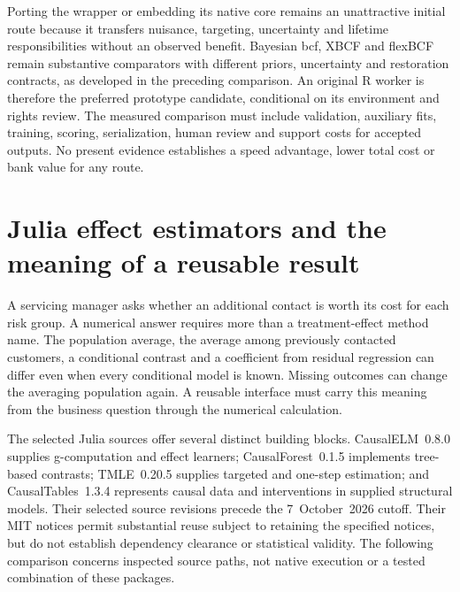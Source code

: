 Porting the wrapper or embedding its native core remains an unattractive initial route because it transfers nuisance, targeting, uncertainty and lifetime responsibilities without an observed benefit. Bayesian bcf, XBCF and flexBCF remain substantive comparators with different priors, uncertainty and restoration contracts, as developed in the preceding comparison. An original R worker is therefore the preferred prototype candidate, conditional on its environment and rights review. The measured comparison must include validation, auxiliary fits, training, scoring, serialization, human review and support costs for accepted outputs. No present evidence establishes a speed advantage, lower total cost or bank value for any route.~\citep{exec21_grf_reuse,exec21_cxx_bcf,exec21_cxx_xbcf,exec21_cxx_flexbcf}



\section{Julia effect estimators and the meaning of a reusable result}
\label{exec21:effects-scope}

A servicing manager asks whether an additional contact is worth its cost for
each risk group. A numerical answer requires more than a treatment-effect
method name. The population average, the average among previously contacted
customers, a conditional contrast and a coefficient from residual regression
can differ even when every conditional model is known. Missing outcomes can
change the averaging population again. A reusable interface must carry this
meaning from the business question through the numerical calculation.

The selected Julia sources offer several distinct building blocks.
CausalELM~0.8.0 supplies g-computation and effect learners; CausalForest~0.1.5
implements tree-based contrasts; TMLE~0.20.5 supplies targeted and one-step
estimation; and CausalTables~1.3.4 represents causal data and interventions in
supplied structural models. Their selected source revisions precede the
7~October~2026 cutoff. Their MIT notices permit substantial reuse subject to
retaining the specified notices, but do not establish dependency clearance or
statistical validity. The following comparison concerns inspected source
paths, not native execution or a tested combination of these packages.
\citep{exec21_effects_causalelm,exec21_effects_causalforest,exec21_effects_tmle,exec21_effects_causaltables}

